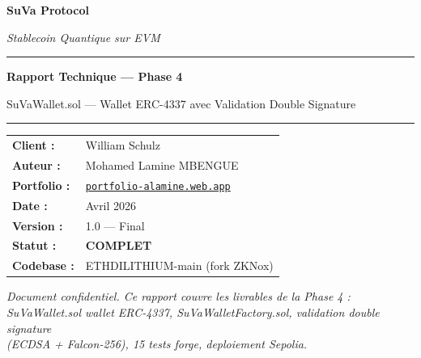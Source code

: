 \documentclass[11pt,a4paper]{article}
\begin{document}

\begin{titlepage}
\centering
\vspace*{2cm}
{\Huge\bfseries\textcolor{suva-blue}{SuVa Protocol}\par}
\vspace{0.5cm}
{\Large\textit{Stablecoin Quantique sur EVM}\par}
\vspace{1.5cm}
\rule{\linewidth}{0.5pt}
\vspace{0.5cm}
{\LARGE\bfseries Rapport Technique --- Phase 4\par}
\vspace{0.3cm}
{\large SuVaWallet.sol --- Wallet ERC-4337 avec Validation Double Signature\par}
\vspace{0.5cm}
\rule{\linewidth}{0.5pt}
\vspace{2cm}

\begin{tabular}{ll}
\textbf{Client :}    & William Schulz \\[4pt]
\textbf{Auteur :}    & Mohamed Lamine MBENGUE \\[4pt]
\textbf{Portfolio :} & \href{https://portfolio-alamine.web.app}{\texttt{portfolio-alamine.web.app}} \\[4pt]
\textbf{Date :}      & Avril 2026 \\[4pt]
\textbf{Version :}   & 1.0 --- Final \\[4pt]
\textbf{Statut :}    & \textcolor{pass-green}{\textbf{COMPLET}} \\[4pt]
\textbf{Codebase :}  & ETHDILITHIUM-main (fork ZKNox) \\
\end{tabular}

\vfill
\begin{tcolorbox}[enhanced,colback=suva-blue!8,colframe=suva-blue,arc=4mm]
\centering\textit{Document confidentiel. Ce rapport couvre les livrables de la Phase 4 :\\
SuVaWallet.sol wallet ERC-4337, SuVaWalletFactory.sol, validation double signature\\
(ECDSA + Falcon-256), 15 tests forge, deploiement Sepolia.}
\end{tcolorbox}
\end{titlepage}

\tableofcontents
\newpage

\end{document}
